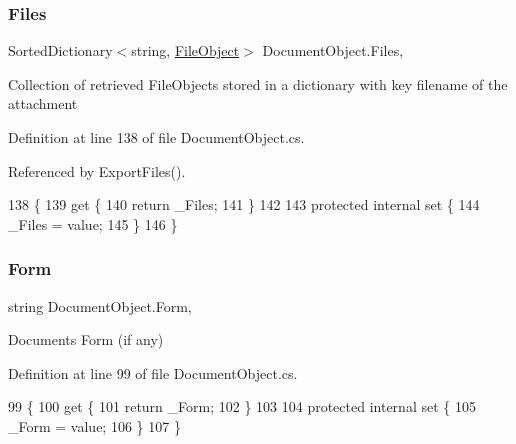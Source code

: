 \subsubsection{\texorpdfstring{Files}{Files}}
{\footnotesize\ttfamily Sorted\+Dictionary$<$string, \mbox{\hyperlink{class_file_object}{File\+Object}}$>$ Document\+Object.\+Files\hspace{0.3cm}{\ttfamily [get]}, {\ttfamily [set]}}



Collection of retrieved File\+Objects stored in a dictionary with key filename of the attachment 



Definition at line 138 of file Document\+Object.\+cs.



Referenced by Export\+Files().


\begin{DoxyCode}
138                                                       \{
139         \textcolor{keyword}{get} \{
140             \textcolor{keywordflow}{return} \_Files;
141         \}
142 
143         \textcolor{keyword}{protected} \textcolor{keyword}{internal} \textcolor{keyword}{set} \{
144             \_Files = value;
145         \}
146     \}
\end{DoxyCode}
\mbox{\label{class_document_object_ad3444a6c018474405064070fa9a94afe}} 
\subsubsection{\texorpdfstring{Form}{Form}}
{\footnotesize\ttfamily string Document\+Object.\+Form\hspace{0.3cm}{\ttfamily [get]}, {\ttfamily [set]}}



Documents Form (if any) 



Definition at line 99 of file Document\+Object.\+cs.


\begin{DoxyCode}
99                        \{
100         \textcolor{keyword}{get} \{
101             \textcolor{keywordflow}{return} \_Form;
102         \}
103 
104         \textcolor{keyword}{protected} \textcolor{keyword}{internal} \textcolor{keyword}{set} \{
105             \_Form = value;
106         \}
107     \}
\end{DoxyCode}
\mbox{\label{class_document_object_a3b2075b73f38d05091b69decc6ce7992}} 
